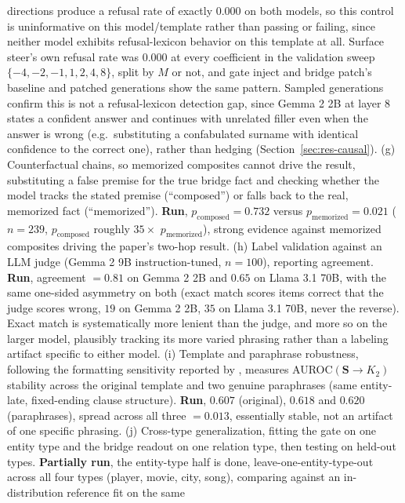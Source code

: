 \documentclass{article}
\newcommand{\gate}{\mathbf{S}}
\begin{document}
directions produce a refusal rate of exactly $0.000$ on both models, so this control is uninformative
on this model/template rather than passing or failing, since neither model exhibits refusal-lexicon
behavior on this template at all. Surface steer's own refusal rate was $0.000$ at every coefficient in
the validation sweep $\{-4,-2,-1,1,2,4,8\}$, split by $M$ or not, and gate inject and bridge patch's
baseline and patched generations show the same pattern. Sampled generations confirm this is not a
refusal-lexicon detection gap, since Gemma 2 2B at layer 8 states a confident answer and continues
with unrelated filler even when the answer is wrong (e.g.\ substituting a confabulated surname with
identical confidence to the correct one), rather than hedging (Section~\ref{sec:res-causal}).
(g) Counterfactual chains, so memorized composites cannot drive the result, substituting a false
premise for the true bridge fact and checking whether the model tracks the stated premise
(``composed'') or falls back to the real, memorized fact (``memorized''). \textbf{Run},
$p_{\mathrm{composed}}=0.732$ versus $p_{\mathrm{memorized}}=0.021$ ($n=239$, $p_{\mathrm{composed}}$
roughly $35\times$ $p_{\mathrm{memorized}}$), strong evidence against memorized composites driving
the paper's two-hop result. (h) Label validation against an {LLM} judge (Gemma 2 9B
instruction-tuned, $n=100$), reporting agreement. \textbf{Run}, agreement $=0.81$ on Gemma 2 2B and
$0.65$ on Llama 3.1 70B, with the same one-sided asymmetry on both (exact match scores items correct
that the judge scores wrong, $19$ on Gemma 2 2B, $35$ on Llama 3.1 70B, never the reverse). Exact
match is systematically more lenient than the judge, and more so on the larger model, plausibly
tracking its more varied phrasing rather than a labeling artifact specific to either model. (i)
Template and paraphrase robustness, following the
formatting sensitivity reported by \citet{tamoyan2025factual}, measures AUROC$(\gate\!\to\!K_2)$
stability across the original template and two genuine paraphrases (same entity-late, fixed-ending
clause structure). \textbf{Run}, $0.607$ (original), $0.618$ and $0.620$ (paraphrases), spread across
all three $=0.013$, essentially stable, not an artifact of one specific phrasing. (j) Cross-type
generalization, fitting the
gate on one entity type and the bridge readout on one relation type, then testing on held-out types.
\textbf{Partially run}, the entity-type half is done, leave-one-entity-type-out across all four
types (player, movie, city, song), comparing against an in-distribution reference fit on the same
\end{document}
